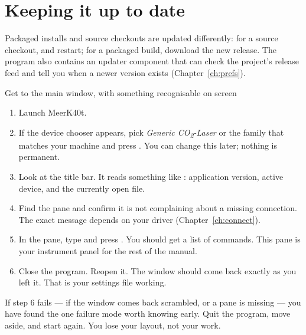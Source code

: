 \section{Keeping it up to date}

Packaged installs and source checkouts are updated differently: for a source
checkout,  and restart; for a packaged build, download the new
release. The program also contains an updater component that can check the
project's release feed and tell you when a newer version exists
(Chapter~\ref{ch:prefs}).

\begin{tryit}{Get to the main window, with something recognisable on screen}
\begin{enumerate}[label=\arabic*.,leftmargin=1.4em]
  \item Launch MeerK40t.
  \item If the device chooser appears, pick \emph{Generic CO\textsubscript{2}-Laser}
        or the family that matches your machine and press . You can change
        this later; nothing is permanent.
  \item Look at the title bar. It reads something like
        : application
        version, active device, and the currently open file.
  \item Find the  pane and confirm it is not complaining about
        a missing connection. The exact message depends on your driver
        (Chapter~\ref{ch:connect}).
  \item In the  pane, type  and press . You
        should get a list of commands. This pane is your instrument panel for the
        rest of the manual.
  \item Close the program. Reopen it. The window should come back exactly as you
        left it. That is your settings file working.
\end{enumerate}
\end{tryit}

\noindent If step 6 fails --- if the window comes back scrambled, or a pane is
missing --- you have found the one failure mode worth knowing early. Quit the
program, move  aside, and start again. You lose your layout,
not your work.
